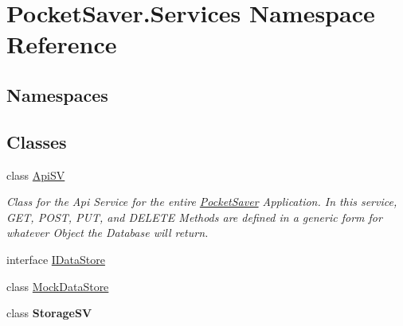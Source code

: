 \hypertarget{namespace_pocket_saver_1_1_services}{}\section{Pocket\+Saver.\+Services Namespace Reference}
\label{namespace_pocket_saver_1_1_services}
\subsection*{Namespaces}
\begin{DoxyCompactItemize}
\end{DoxyCompactItemize}
\subsection*{Classes}
\begin{DoxyCompactItemize}
\item 
class \hyperlink{class_pocket_saver_1_1_services_1_1_api_s_v}{Api\+SV}
\begin{DoxyCompactList}\small\item\em Class for the Api Service for the entire \hyperlink{namespace_pocket_saver}{Pocket\+Saver} Application. In this service, G\+ET, P\+O\+ST, P\+UT, and D\+E\+L\+E\+TE Methods are defined in a generic form for whatever Object the Database will return. \end{DoxyCompactList}\item 
interface \hyperlink{interface_pocket_saver_1_1_services_1_1_i_data_store}{I\+Data\+Store}
\item 
class \hyperlink{class_pocket_saver_1_1_services_1_1_mock_data_store}{Mock\+Data\+Store}
\item 
class {\bfseries Storage\+SV}
\end{DoxyCompactItemize}
